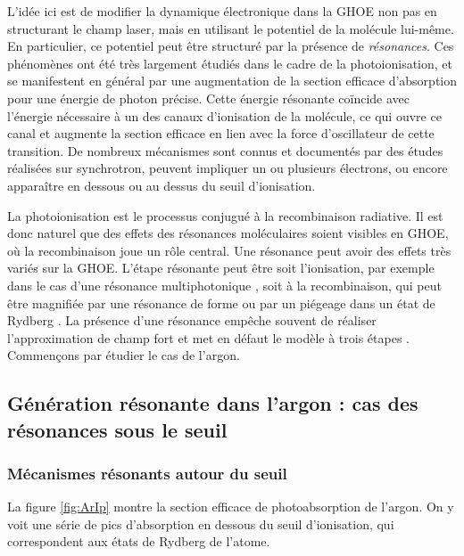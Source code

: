 L'idée ici est de modifier la dynamique électronique dans la GHOE non pas en structurant le champ laser, mais en utilisant le potentiel de la molécule lui-même. En particulier, ce potentiel peut être structuré par la présence de \textit{résonances}. Ces phénomènes ont été très largement étudiés dans le cadre de la photoionisation, et se manifestent en général par une augmentation de la section efficace d'absorption pour une énergie de photon précise. Cette énergie résonante coïncide avec l'énergie nécessaire à un des canaux d'ionisation de la molécule, ce qui ouvre ce canal et augmente la section efficace en lien avec la force d'oscillateur de cette transition. De nombreux mécanismes sont connus et documentés par des études réalisées sur synchrotron, peuvent impliquer un ou plusieurs électrons, ou encore apparaître en dessous ou au dessus du seuil d'ionisation.

La photoionisation est le processus conjugué à la recombinaison radiative. Il est donc naturel que des effets des résonances moléculaires soient visibles en GHOE, où la recombinaison joue un rôle central. Une résonance peut avoir des effets très variés sur la GHOE. L'étape résonante peut être soit l'ionisation, par exemple dans le cas d'une résonance multiphotonique , soit à la recombinaison, qui peut être magnifiée par une résonance de forme ou par un piégeage dans un état de Rydberg . La présence d'une résonance empêche souvent de réaliser l'approximation de champ fort et met en défaut le modèle à trois étapes . Commençons par étudier le cas de l'argon.

\subsection{Génération résonante dans l'argon : cas des résonances sous le seuil}
\subsubsection{Mécanismes résonants autour du seuil}
La figure \ref{fig:ArIp} montre la section efficace de photoabsorption de l'argon. On y voit une série de pics d'absorption en dessous du seuil d'ionisation, qui correspondent aux états de Rydberg de l'atome.

